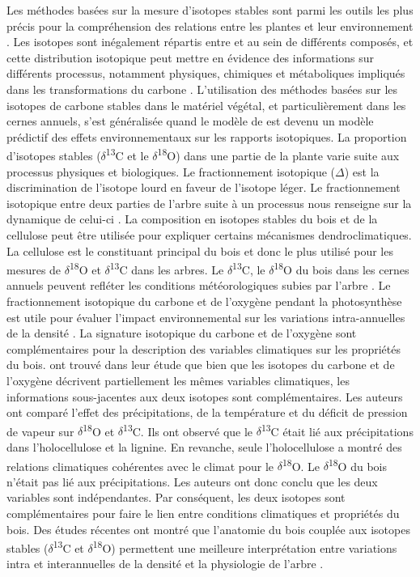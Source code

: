 \documentclass[a4paper,12pt]{report}
\newcommand{\Ctreize}{$\delta$\textsuperscript{13}C\xspace}
\newcommand{\Odixhuit}{$\delta$\textsuperscript{18}O\xspace}
\begin{document}
Les méthodes basées sur la mesure d'isotopes stables sont parmi les outils les plus précis pour la compréhension des relations entre les plantes et leur environnement \citep{Dawson2002}. Les isotopes sont inégalement répartis entre et au sein de différents composés, et cette distribution isotopique peut mettre en évidence des informations sur différents processus, notamment physiques, chimiques et métaboliques impliqués dans les transformations du carbone \citep{Farquhar1989}. L'utilisation des méthodes basées sur les isotopes de carbone stables dans le matériel végétal, et particulièrement dans les cernes annuels, s'est généralisée quand le modèle de \cite{Farquhar1989} est devenu un modèle prédictif des effets environnementaux sur les rapports isotopiques. La proportion d'isotopes stables (\Ctreize et le \Odixhuit) dans une partie de la plante varie suite aux processus physiques et biologiques. Le fractionnement isotopique ($\Delta$) est la discrimination de l'isotope lourd en faveur de l'isotope léger. Le fractionnement isotopique entre deux parties de l'arbre suite à un processus nous renseigne sur la dynamique de celui-ci \citep{Farquhar1989}. La composition en isotopes stables du bois et de la cellulose peut être utilisée pour expliquer certains mécanismes dendroclimatiques. La cellulose est le constituant principal du bois et donc le plus utilisé pour les mesures de \Odixhuit et \Ctreize dans les arbres. Le \Ctreize, le \Odixhuit du bois dans les cernes annuels peuvent refléter les conditions météorologiques subies par l'arbre \citep{Duquesnay1998,McCarroll2004,Hartl-meier2015}. Le fractionnement isotopique du carbone et de l'oxygène pendant la photosynthèse est utile pour évaluer l'impact environnemental sur les variations intra-annuelles de la densité \citep{Farquhar1989,JonLloyd1994}. La signature isotopique du carbone et de l'oxygène sont complémentaires pour la description des variables climatiques sur les propriétés du bois. \cite{FERRIO2005} ont trouvé dans leur étude que bien que les isotopes du carbone et de l'oxygène décrivent partiellement les mêmes variables climatiques, les informations sous-jacentes aux deux isotopes sont complémentaires. Les auteurs ont comparé l'effet des précipitations, de la température et du déficit de pression de vapeur sur \Odixhuit et \Ctreize. Ils ont observé que le \Ctreize était lié aux précipitations dans l'holocellulose et la lignine. En revanche, seule l'holocellulose a montré des relations climatiques cohérentes avec le climat pour le \Odixhuit. Le \Odixhuit du bois n'était pas lié aux précipitations. Les auteurs ont donc conclu que les deux variables sont indépendantes. Par conséquent, les deux isotopes sont complémentaires pour faire le lien entre conditions climatiques et propriétés du bois. Des études récentes ont montré que l'anatomie du bois couplée aux isotopes stables (\Ctreize et \Odixhuit) permettent une meilleure interprétation entre variations intra et interannuelles de la densité et la physiologie de l'arbre \citep{Micco2007,Vaganov2009,Sarris2013}. \\ 
\end{document}
